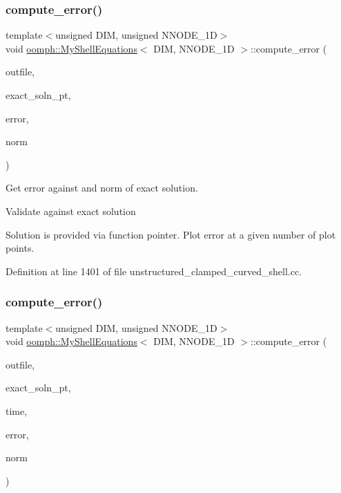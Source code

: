 \subsubsection{\texorpdfstring{compute\+\_\+error()}{compute\_error()}\hspace{0.1cm}{\footnotesize\ttfamily [1/2]}}
{\footnotesize\ttfamily template$<$unsigned D\+IM, unsigned N\+N\+O\+D\+E\+\_\+1D$>$ \\
void \hyperlink{classoomph_1_1MyShellEquations}{oomph\+::\+My\+Shell\+Equations}$<$ D\+IM, N\+N\+O\+D\+E\+\_\+1D $>$\+::compute\+\_\+error (\begin{DoxyParamCaption}\item[{std\+::ostream \&}]{outfile,  }\item[{Finite\+Element\+::\+Steady\+Exact\+Solution\+Fct\+Pt}]{exact\+\_\+soln\+\_\+pt,  }\item[{double \&}]{error,  }\item[{double \&}]{norm }\end{DoxyParamCaption})}



Get error against and norm of exact solution. 

Validate against exact solution

Solution is provided via function pointer. Plot error at a given number of plot points. 

Definition at line 1401 of file unstructured\+\_\+clamped\+\_\+curved\+\_\+shell.\+cc.

\mbox{\label{classoomph_1_1MyShellEquations_a6a62a37fa44a5001c167071f9bf80c2f}} 
\subsubsection{\texorpdfstring{compute\+\_\+error()}{compute\_error()}\hspace{0.1cm}{\footnotesize\ttfamily [2/2]}}
{\footnotesize\ttfamily template$<$unsigned D\+IM, unsigned N\+N\+O\+D\+E\+\_\+1D$>$ \\
void \hyperlink{classoomph_1_1MyShellEquations}{oomph\+::\+My\+Shell\+Equations}$<$ D\+IM, N\+N\+O\+D\+E\+\_\+1D $>$\+::compute\+\_\+error (\begin{DoxyParamCaption}\item[{std\+::ostream \&}]{outfile,  }\item[{Finite\+Element\+::\+Unsteady\+Exact\+Solution\+Fct\+Pt}]{exact\+\_\+soln\+\_\+pt,  }\item[{const double \&}]{time,  }\item[{double \&}]{error,  }\item[{double \&}]{norm }\end{DoxyParamCaption})\hspace{0.3cm}{\ttfamily [inline]}}



